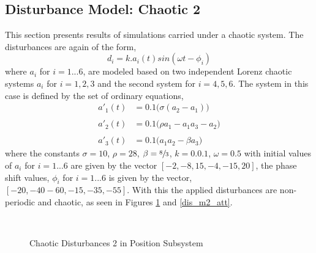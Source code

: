 \documentclass[letterpaper%
, twoside%
, 12pt%
,memoire%
, english%
,creativecommons,hyperref%
]{thETS}
\theoremstyle{newThmStyle}
\begin{document}
\subsection{Disturbance Model: Chaotic 2}
This section presents results of simulations carried under a chaotic system. The disturbances are again of the form,
\begin{equation}
d_i = k.a_i(t)sin(\omega t-\phi_i)
\label{eq:dist_2}
\end{equation}
where $a_i$ for $i=1...6$, are modeled based on two independent Lorenz chaotic systems $a_i$ for $i=1,2,3$ and the second system for $i=4,5,6$. The system in this case is defined by the set of ordinary equations, 
\begin{subequations}
\begin{align}
a'_1(t) &= 0.1\big(\sigma(a_2-a_1)\big)\\ \nonumber\\
a'_2(t) &= 0.1\big(\rho a_1 - a_1 a_3 - a_2\big)\\ \nonumber \\
a'_3(t) &= 0.1\big(a_1 a_2 - \beta a_3\big)
\end{align}
\end{subequations}
where the constants $\sigma=10$, $\rho=28$, $\beta=\sfrac{8}{3}$, $k=0.0.1$, $\omega=0.5$ with initial values of $a_i$ for $i=1...6$ are given by the vector $[-2,-8,15,-4,-15,20]$, the phase shift values, $\phi_i$ for $i=1...6$ is given by the vector, $[-20,-40-60,-15,-35,-55]$. With this the applied disturbances are non-periodic and chaotic, as seen in Figures \ref{dis_m2_pos} and \ref{dis_m2_att}.

\begin{figure}[H]
\centering
{}
\\ \parbox{0.75\textwidth}{\caption{Chaotic Disturbances 2 in Position Subsystem} \label{dis_m2_pos}}
\end{figure}
\end{document}
